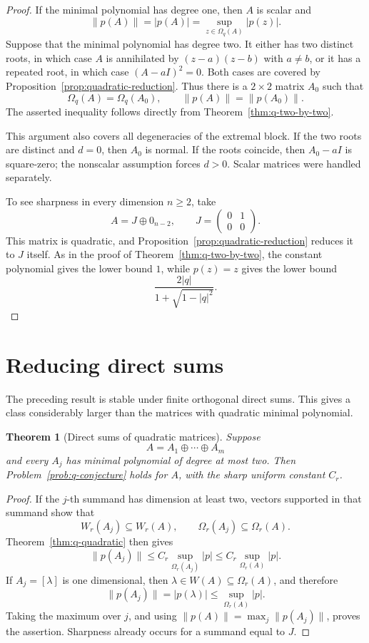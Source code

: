\documentclass[11pt]{article}
\newtheorem{theorem}{Theorem}[section]
\theoremstyle{remark}
\begin{document}
\begin{proof}
If the minimal polynomial has degree one, then \(A\) is scalar and
\[
  \|p(A)\|=|p(A)|
  =\sup_{z\in\Omega_q(A)}|p(z)|.
\]
Suppose that the minimal polynomial has degree two.  It either has two
distinct roots, in which case \(A\) is annihilated by
\((z-a)(z-b)\) with \(a\neq b\), or it has a repeated root, in which
case \((A-aI)^2=0\).  Both cases are covered by
Proposition~\ref{prop:quadratic-reduction}.  Thus there is a
\(2\times2\) matrix \(A_0\) such that
\[
  \Omega_q(A)=\Omega_q(A_0),
  \qquad
  \|p(A)\|=\|p(A_0)\|.
\]
The asserted inequality follows directly from
Theorem~\ref{thm:q-two-by-two}.

This argument also covers all degeneracies of the extremal block.  If
the two roots are distinct and \(d=0\), then \(A_0\) is normal.  If
the roots coincide, then \(A_0-aI\) is square-zero; the nonscalar
assumption forces \(d>0\).  Scalar matrices were handled separately.

To see sharpness in every dimension \(n\geq2\), take
\[
  A=J\oplus0_{n-2},
  \qquad
  J=
  \begin{pmatrix}
    0&1\\
    0&0
  \end{pmatrix}.
\]
This matrix is quadratic, and
Proposition~\ref{prop:quadratic-reduction} reduces it to \(J\) itself.
As in the proof of Theorem~\ref{thm:q-two-by-two}, the constant
polynomial gives the lower bound \(1\), while \(p(z)=z\) gives the
lower bound
\[
  \frac{2|q|}{1+\sqrt{1-|q|^2}}.
\]
\end{proof}

 
\section{Reducing direct sums}

The preceding result is stable under finite orthogonal direct
sums.  This gives a class considerably larger than the matrices with
quadratic minimal polynomial.

\begin{theorem}[Direct sums of quadratic matrices]
\label{thm:direct-sums}
Suppose
\[
 A=A_1\oplus\cdots\oplus A_m
\]
and every \(A_j\) has minimal polynomial of degree at most two.
Then Problem~\ref{prob:q-conjecture} holds for \(A\), with the sharp
uniform constant \(C_r\).
\end{theorem}

\begin{proof}
If the \(j\)-th summand has dimension at least two, vectors supported
in that summand show that
\[
 W_r(A_j)\subseteq W_r(A),
 \qquad
 \Omega_r(A_j)\subseteq\Omega_r(A).
\]
Theorem~\ref{thm:q-quadratic} then gives
\[
 \|p(A_j)\|
 \leq C_r\sup_{\Omega_r(A_j)}|p|
 \leq C_r\sup_{\Omega_r(A)}|p|.
\]
If \(A_j=[\lambda]\) is one dimensional, then
\(\lambda\in W(A)\subseteq\Omega_r(A)\), and therefore
\[
 \|p(A_j)\|=|p(\lambda)|
 \leq\sup_{\Omega_r(A)}|p|.
\]
Taking the maximum over \(j\), and using
\(\|p(A)\|=\max_j\|p(A_j)\|\), proves the assertion.  Sharpness
already occurs for a summand equal to \(J\).
\end{proof}
\end{document}
